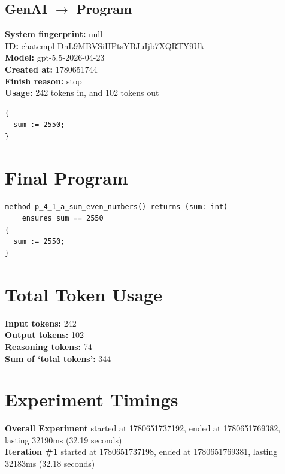 \documentclass{article}
\begin{document}
\subsection*{GenAI $\rightarrow$ Program}
\textbf{System fingerprint: }null
\\\textbf{ID: }chatcmpl-DnL9MBVSiHPtsYBJuIjb7XQRTY9Uk
\\\textbf{Model: }gpt-5.5-2026-04-23
\\\textbf{Created at: }1780651744
\\\textbf{Finish reason: }stop
\\\textbf{Usage: }242 tokens in, and 102 tokens out
\begin{lstlisting}
{
  sum := 2550;
}
\end{lstlisting}
\section*{Final Program}
\begin{lstlisting}
method p_4_1_a_sum_even_numbers() returns (sum: int)
	ensures sum == 2550
{
  sum := 2550;
}
\end{lstlisting}
\section*{Total Token Usage}
\textbf{Input tokens: }242
\\\textbf{Output tokens: }102
\\\textbf{Reasoning tokens: }74
\\\textbf{Sum of `total tokens': }344
\section*{Experiment Timings}
\textbf{Overall Experiment} started at 1780651737192, ended at 1780651769382, lasting 32190ms (32.19 seconds)
\\\textbf{Iteration \#1} started at 1780651737198, ended at 1780651769381, lasting 32183ms (32.18 seconds)
\end{document}
